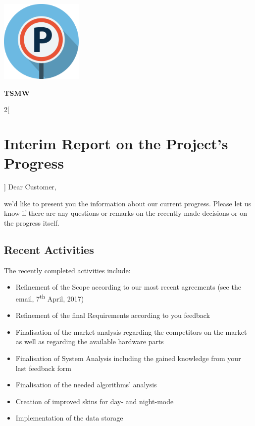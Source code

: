 \documentclass[12pt, a4paper, oneside, british]{report}
\begin{document}
\begin{center}
\includegraphics[width=0.3\textwidth]{logo.png}

\vspace{0.5cm}

{\Large
\textbf{TSMW}}
\end{center}

\begin{multicols}{2}[\section{Interim Report on the Project's Progress}]
Dear Customer,

\vspace{0.5cm}
\noindent we'd like to present you the information about our current progress. Please let us know if there are any questions or remarks on the recently made decisions or on the progress itself.

\subsection{Recent Activities}
The recently completed activities include:
\begin{itemize}
\item Refinement of the Scope according to our most recent agreements (see the email, 7\textsuperscript{th} April, 2017)
\item Refinement of the final Requirements according to you feedback
\item Finalisation of the market analysis regarding the competitors on the market as well as regarding the available hardware parts
\item Finalisation of System Analysis including the gained knowledge from your last feedback form
\item Finalisation of the needed algorithms' analysis
\item Creation of improved skins for day- and night-mode
\item Implementation of the data storage 
\end{itemize}


\end{multicols}
\end{document}
